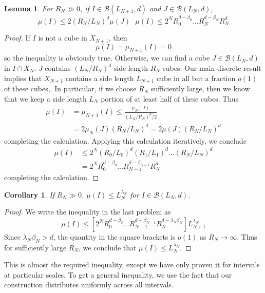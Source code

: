 \documentclass{article}
\theoremstyle{plain}
\newtheorem{lemma}{Lemma}
\newtheorem*{corollary}{Corollary}
\theoremstyle{plain}
\begin{document}
\begin{lemma}
	For $R_N \gg 0$, if $I \in \mathcal{B}(L_{N+1},d)$ and $J \in \mathcal{B}(L_N,d)$,
	\[ \mu(I) \leq 2 (R_N/L_N)^d \mu(J)\ \ \ \mu(I) \leq 2^N R_0^{d - \beta_0} \dots R_N^{d - \beta_N} R_N^d \]
\end{lemma}
\begin{proof}
	If $I$ is not a cube in $X_{N+1}$, then
	\[ \mu(I) = \mu_{N+1}(I) = 0 \]
	so the inequality is obviously true. Otherwise, we can find a cube $J \in \mathcal{B}(L_N,d)$ in $I \cap X_N$. $J$ contains $(L_N/R_N)^d$ side length $R_N$ cubes. Our main discrete result implies that $X_{N+1}$ contains a side length $L_{N+1}$ cube in all but a fraction $o(1)$ of these cubes,. In particular, if we choose $R_N$ sufficiently large, then we know that we keep a side length $L_N$ portion of at least half of these cubes. Thus
	\begin{align*}
		\mu(I) &= \mu_{N+1}(I) \leq \frac{\mu_N(J)}{(L_N/R_N)^d/2}\\
		&= 2 \mu_N(J) (R_N/L_N)^d = 2 \mu(J) (R_N/L_N)^d
	\end{align*}
	completing the calculation. Applying this calculation iteratively, we conclude
	\begin{align*}
		\mu(I) &\leq 2^N (R_0/L_0)^d (R_1/L_1)^d \dots (R_N/L_N)^d\\
		&= 2^N R_0^{d - \beta_0} \dots R_{N-1}^{d - \beta_{N-1}} R_N^d
	\end{align*}
	completing the calculation.
\end{proof}

\begin{corollary}
	If $R_N \gg 0$, $\mu(I) \leq L_N^{\lambda_N}$ for $I \in \mathcal{B}(L_N,d)$.
\end{corollary}
\begin{proof}
	We write the inequality in the last problem as
	\[ \mu(I) \leq [2^N R_0^{d - \beta_0} \dots R_{N-1}^{d - \beta_{N-1}} R_N^{d - \lambda_N \beta_N}] L_{N+1}^{\lambda_N} \]
	Since $\lambda_N \beta_N > d$, the quantity in the square brackets is $o(1)$ as $R_N \to \infty$. Thus for sufficiently large $R_N$, we conclude that $\mu(I) \leq L_N^{\lambda_N}$.
\end{proof}

This is almost the required inequality, except we have only proven it for intervals at particular scales. To get a general inequality, we use the fact that our construction distributes uniformly across all intervals.
\end{document}
